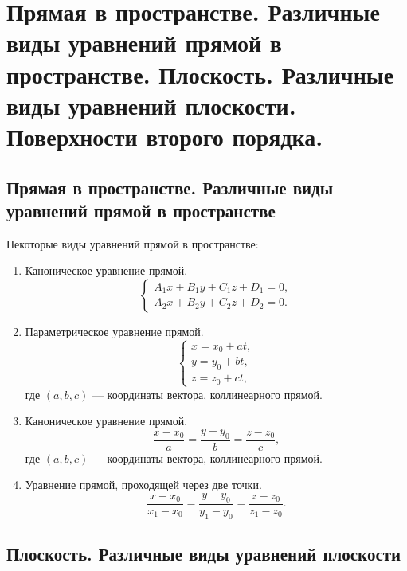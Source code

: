 \documentclass[12pt]{report}
\theoremstyle{definition}
\begin{document}
\section
{
  Прямая в пространстве. Различные виды уравнений прямой в пространстве.
  Плоскость. Различные виды уравнений плоскости.
  Поверхности второго порядка.
}

\subsection{Прямая в пространстве. Различные виды уравнений прямой в пространстве}
Некоторые виды уравнений прямой в пространстве:
\begin{enumerate}
\item Каноническое уравнение прямой.
  $$
    \begin{cases}
      A_1 x + B_1 y + C_1 z + D_1 = 0, \\
      A_2 x + B_2 y + C_2 z + D_2 = 0.
    \end{cases}
  $$
\item Параметрическое уравнение прямой.
  $$
  \begin{cases}
    x = x_0 + at, \\
    y = y_0 + bt, \\
    z = z_0 + ct,
  \end{cases}
  $$
  где $(a, b, c)$ --- координаты вектора, коллинеарного прямой.
\item Каноническое уравнение прямой.
  $$
    \dfrac{x - x_0}{a} = \dfrac{y - y_0}{b} = \dfrac{z - z_0}{c},
  $$
  где $(a, b, c)$ --- координаты вектора, коллинеарного прямой.

\item Уравнение прямой, проходящей через две точки.
  $$
    \dfrac{x - x_0}{x_1 - x_0} = \dfrac{y - y_0}{y_1 - y_0} = \dfrac{z - z_0}{z_1 - z_0}.
  $$

\end{enumerate}

\subsection{Плоскость. Различные виды уравнений плоскости}
\end{document}
